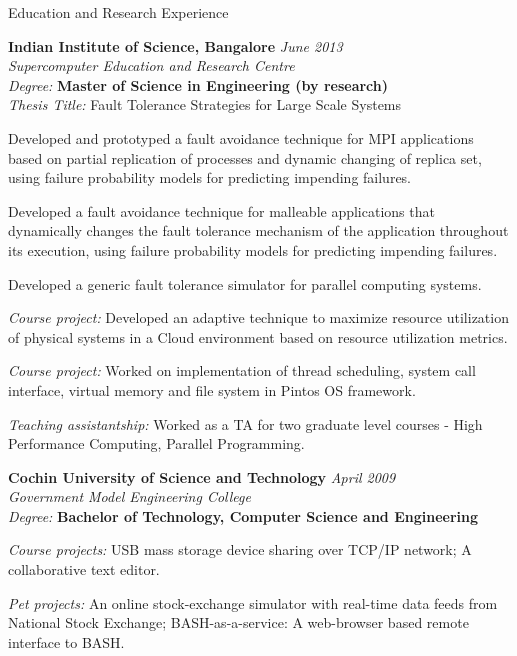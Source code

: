\documentclass{resume} %
\begin{document}

\begin{rSection}{Education and Research Experience}

{\bf Indian Institute of Science, Bangalore} \hfill {\em June 2013} \\ 
{\em Supercomputer Education and Research Centre} \smallskip \\
{\em Degree:} {\bf Master of Science in Engineering (by research)} \\
{\em Thesis Title:} Fault Tolerance Strategies for Large Scale Systems

\begin {rEduContList}

\item Developed and prototyped a fault avoidance technique for MPI applications based on partial replication of processes and dynamic changing of replica set, using failure probability models for predicting impending failures.
\smallskip
\item Developed a fault avoidance technique for malleable applications that dynamically changes the fault tolerance mechanism of the application throughout its execution, using failure probability models for predicting impending failures.
\smallskip
\item Developed a generic fault tolerance simulator for parallel computing systems. 
\smallskip
\item {\em Course project:} Developed an adaptive technique to maximize resource utilization of physical systems in a Cloud environment based on resource utilization metrics.
\smallskip
\item {\em Course project:} Worked on implementation of thread scheduling, system call interface, virtual memory and file system in Pintos OS framework.
\smallskip
\item {\em Teaching assistantship:} Worked as a TA for two graduate level courses - High Performance Computing, Parallel Programming.

\end {rEduContList}

{\bf Cochin University of Science and Technology} \hfill {\em April 2009} \\
{\em Government Model Engineering College} \smallskip \\
{\em Degree:} {\bf Bachelor of Technology, Computer Science and Engineering}

\begin {rEduContList}
\item {\em Course projects:} USB mass storage device sharing over TCP/IP network; A collaborative text editor.
\item {\em Pet projects:} An online stock-exchange simulator with real-time data feeds from National Stock Exchange; BASH-as-a-service: A web-browser based remote interface to BASH.
\end {rEduContList}

\end{rSection}
\end{document}
